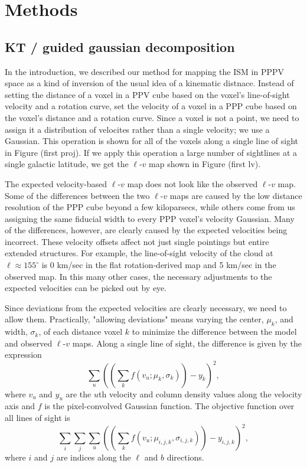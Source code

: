 \section{Methods}

\subsection{KT / guided gaussian decomposition}

In the introduction, we described our method for mapping the ISM in PPPV space as a kind of inversion of the usual idea of a kinematic distnace. Instead of setting the distance of a voxel in a PPV cube based on the voxel's line-of-sight velocity and a rotation curve, set the velocity of a voxel in a PPP cube based on the voxel's distance and a rotation curve. Since a voxel is not a point, we need to assign it a distribution of velocites rather than a single velocity; we use a Gaussian. This operation is shown for all of the voxels along a single line of sight in Figure (first proj). If we apply this operation a large number of sightlines at a single galactic latitude, we get the $\ell$-$v$ map shown in Figure (first lv). 

The expected velocity-based $\ell$-$v$ map does not look like the observed $\ell$-$v$ map. Some of the differences between the two $\ell$-$v$ maps are  caused by the low distance resolution of the PPP cube beyond a few kiloparsecs, while others come from us assigning the same fiducial width to every PPP voxel's velocity Gaussian. Many of the differences, however, are clearly caused by the expected velocities being incorrect. These velocity offsets affect not just single pointings but entire extended structures. For example, the line-of-sight velocity of the cloud at $\ell \approx 155^\circ$ is 0 km/sec in the flat rotation-derived map and 5 km/sec in the observed map. In this many other cases, the necessary adjustments to the expected velocities can be picked out by eye.

Since deviations from the expected velocities are clearly necessary, we need to allow them. Practically, "allowing deviations" means varying the center, $\mu_k$, and width, $\sigma_k$, of each distance voxel $k$ to minimize the difference between the model and observed $\ell$-$v$ maps. Along a single line of sight, the difference is given by the expression
\begin{equation}
    \sum_u ((\sum_k f(v_u; \mu_k, \sigma_k)) - y_k)^2,
\end{equation}
where $v_u$ and $y_u$ are the $u$th velocity and column density values along the velocity axis and $f$ is the pixel-convolved Gaussian function.
The objective function over all lines of sight is
\begin{equation}
\label{eqn:objective-nosprings}
    \sum_i \sum_j \sum_u ((\sum_k f(v_u; \mu_{i,j,k}, \sigma_{i,j,k})) - y_{i,j,k})^2,
\end{equation}
where $i$ and $j$ are indices along the $\ell$ and $b$ directions. 


